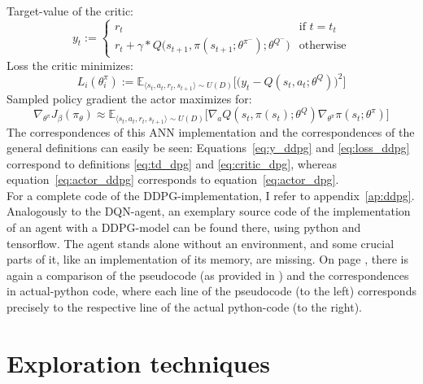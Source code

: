 \noindent Target-value of the critic:
\begin{equation} \label{eq:y_ddpg}
	y_t := \begin{cases} 
	r_t & \text{if } t = t_t\\
	r_t + \gamma * Q\big(s_{t+1}, \pi(s_{t+1};\theta^{\pi^-});\theta^{Q^-} \big)  & \text{otherwise} 
	\end{cases} %
\end{equation}
\noindent Loss the critic minimizes:
\begin{equation} \label{eq:loss_ddpg}
	L_i(\theta^\pi_i) := \mathds{E}_{\langle s_t,a_t,r_t,s_{t+1} \rangle \sim U(D)} \Big[\Big( y_t - Q(s_t,a_t;\theta^Q) \Big)^2\Big]
\end{equation}
\noindent Sampled policy gradient the actor maximizes for:
\begin{equation} \label{eq:actor_ddpg}
	\nabla_{\theta^\pi}J_\beta(\pi_\theta) \approx \mathds{E}_{\langle s_t,a_t,r_t,s_{t+1} \rangle \sim U(D)} \Big[ \nabla_a Q(s_t,\pi(s_t);\theta^Q) \nabla_{\theta^\pi} \pi(s_t;\theta^\pi) \Big]
\end{equation}
The correspondences of this ANN implementation and the correspondences of the general definitions can easily be seen: Equations~\ref{eq:y_ddpg} and \ref{eq:loss_ddpg} correspond to definitions \ref{eq:td_dpg} and \ref{eq:critic_dpg}, whereas equation~\ref{eq:actor_ddpg} corresponds to equation~\ref{eq:actor_dpg}.\\

For a complete code of the DDPG-implementation, I refer to appendix~\ref{ap:ddpg}. Analogously to the DQN-agent, an exemplary source code of the implementation of an agent with a DDPG-model can be found there, using python and tensorflow. The agent stands alone without an environment, and some crucial parts of it, like an implementation of its memory, are missing. On page \pageref{ap:ddpg_comparison}, there is again a comparison of the pseudocode (as provided in \cite{lillicrap_continuous_2015}) and the correspondences in actual-python code, where each line of the pseudocode (to the left) corresponds precisely to the respective line of the actual python-code (to the right).



\section{Exploration techniques}

